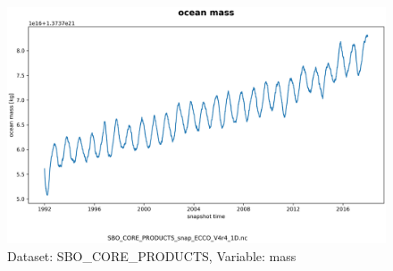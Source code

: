 \begin{figure}[H]
\centering
\includegraphics[scale=0.55]{../images/plots/v4r4/oneD_plots/SBO_Core_Products/mass.png}
\caption{Dataset: SBO\_CORE\_PRODUCTS, Variable: mass}
\label{tab:table-SBO_CORE_PRODUCTS_mass-Plot}
\end{figure}
\newpage
\pagebreak
